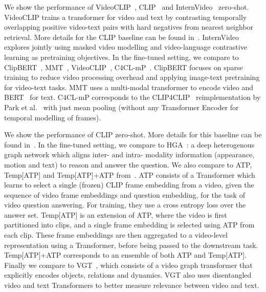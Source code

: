  We show the performance of VideoCLIP~\cite{xu-etal-2021-videoclip}, CLIP~\cite{Radford2021CLIP} and InternVideo~\cite{wang2022internvideo} zero-shot. VideoCLIP trains a transformer for video and text by contrasting temporally overlapping positive video-text pairs with hard negatives from nearest neighbor retrieval. More details for the CLIP baseline can be found in~\cite{Radford2021CLIP}. InternVideo explores jointly using masked video modelling and video-language contrastive learning as pretraining objectives. In the fine-tuned setting, we compare to ClipBERT~\cite{lei2021less}, MMT~\cite{gabeur2020mmt}, VideoCLIP~\cite{xu-etal-2021-videoclip}, C4CL-mP~\cite{park-etal-2022-exposing}. ClipBERT focuses on sparse training to reduce video processing overhead and applying image-text pretraining for video-text tasks. MMT uses a multi-modal transformer to encode video and BERT~\cite{devlin-etal-2019-bert} for text. C4CL-mP corresponds to the CLIP4CLIP~\cite{Luo2021CLIP4Clip} reimplementation by Park et al.~\cite{park-etal-2022-exposing} with just mean pooling (without any Transformer Encoder for temporal modelling of frames). 


  We show the performance of CLIP zero-shot. More details for this baseline can be found in~\cite{Radford2021CLIP}. In the fine-tuned setting, we compare to HGA~\cite{jiang2020reasoning}: a deep heterogenous graph network which aligns inter- and intra- modality information (appearance, motion and text) to reason and answer the question. We also compare to ATP, Temp[ATP] and Temp[ATP]+ATP from~\cite{buch2022revisiting}. ATP consists of a Transformer which learns to select a single (frozen) CLIP frame embedding from a video, given the sequence of video frame embeddings and question embedding, for the task of video question answering. For training, they use a cross entropy loss over the answer set. Temp[ATP] is an extension of ATP, where the video is first partitioned into  clips, and a single frame embedding is selected using ATP from each clip. These  frame embeddings are then aggregated to a video-level representation using a Transformer, before being passed to the downstream task. Temp[ATP]+ATP corresponds to an ensemble of both ATP and Temp[ATP]. Finally we compare to VGT~\cite{xiao2022video}, which consists of a video graph transformer that explicitly encodes objects, relations and dynamics. VGT also uses disentangled video and text Transformers to better measure relevance between video and text.  




